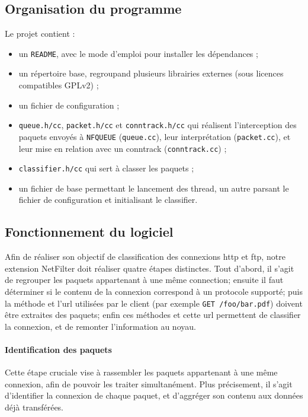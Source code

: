 \subsection{Organisation du programme}
  Le projet contient :
  \begin{itemize}
    \item un \verb+README+, avec le mode d'emploi pour installer les dépendances ;
    \item un répertoire base, regroupand plusieurs librairies externes (sous
    licences compatibles GPLv2) ;
    \item un fichier de configuration ;
    \item \verb+queue.h/cc+, \verb+packet.h/cc+ et \verb+conntrack.h/cc+ qui réalisent l'interception des paquets envoyés à \verb+NFQUEUE+ (\verb+queue.cc+), leur
    interprétation (\verb+packet.cc+), et leur mise en relation avec un conntrack
    (\verb+conntrack.cc+) ;
    \item \verb+classifier.h/cc+ qui sert à classer les paquets ;
    \item un fichier de base permettant le lancement des thread, un autre parsant le fichier de configuration et initialisant le classifier.
  \end{itemize}

\subsection{Fonctionnement du logiciel}
  Afin de réaliser son objectif de classification des connexions http et ftp, notre extension NetFilter doit
  réaliser quatre étapes distinctes. Tout d'abord, il s'agit de regrouper les paquets appartenant à une même
  connection; ensuite il faut déterminer si le contenu de la connexion correspond à un protocole supporté;
  puis la méthode et l'url utilisées par le client (par exemple {\tt GET /foo/bar.pdf}) doivent être extraites
  des paquets; enfin ces méthodes et cette url permettent de classifier la connexion, et de remonter l'information
  au noyau.
  
  \paragraph{Identification des paquets}
    Cette étape cruciale vise à rassembler les paquets appartenant à une même connexion, afin de pouvoir
    les traiter simultanément. Plus précisement, il s'agit d'identifier la connexion de chaque paquet,
    et d'aggréger son contenu aux données déjà transférées.
    
